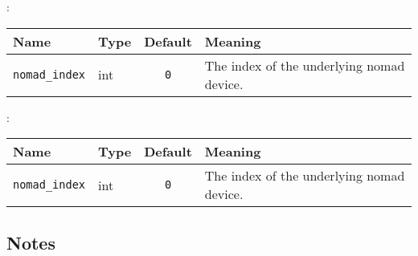 :\\
\begin{center}
{\small \begin{tabularx}{\columnwidth}{|l|l|c|X|}
\hline
Name & Type & Default & Meaning\\
\hline
{\tt nomad\_index} & int & {\tt 0} & The index of the underlying nomad
device.\\
\hline
\end{tabularx}}
\end{center}

:\\
\begin{center}
{\small \begin{tabularx}{\columnwidth}{|l|l|c|X|}
\hline
Name & Type & Default & Meaning\\
\hline
{\tt nomad\_index} & int & {\tt 0} & The index of the underlying nomad
device.\\
\hline
\end{tabularx}}
\end{center}

\subsection*{Notes}
